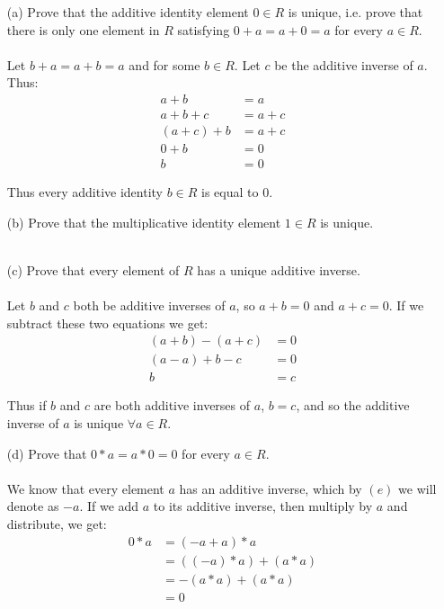 \documentclass[11pt,fleqn]{article}
\begin{document}
\begin{itemize}
\item[(a)] Prove that the additive identity element $0 \in R$ is unique, i.e. prove that there is only one element in $R$ satisfying $0 + a = a + 0 = a$ for every $a \in R$.\\
  \\
  Let $b + a = a + b = a$ and for some $b \in R$.  Let $c$ be the additive inverse of $a$.  Thus:
\begin{align}
  a + b &= a\nonumber\\
  a + b + c &= a + c\nonumber\\
  (a + c) + b &= a + c\nonumber\\
  0 + b &= 0\nonumber\\
  b &= 0\nonumber
\end{align}

Thus every additive identity $b \in R$ is equal to $0$.
  
\item[(b)] Prove that the multiplicative identity element $1 \in R$ is unique.\\
  \\
  
\item[(c)] Prove that every element of $R$ has a unique additive inverse.\\
  \\
  Let $b$ and $c$ both be additive inverses of $a$, so $a+b=0$ and $a+c=0$.  If we subtract these two equations we get:
  \begin{align}
    (a+b) - (a+c) &= 0\nonumber\\
    (a-a) + b - c &= 0\nonumber\\
    b &= c\nonumber
  \end{align}

  Thus if $b$ and $c$ are both additive inverses of $a$, $b = c$, and so the additive inverse of $a$ is unique $\forall a \in R$.

\item[(d)] Prove that $0 * a = a * 0 = 0$ for every $a \in R$.\\
  \\
  We know that every element $a$ has an additive inverse, which by $(e)$ we will denote as $-a$.  If we add $a$ to its additive inverse, then multiply by $a$ and distribute, we get:
\begin{align}
  0 * a &= (-a + a) * a\nonumber\\
  &= ((-a) * a) + (a * a)\nonumber\\
  &= -(a*a) + (a*a)\nonumber\\
  &= 0\nonumber
\end{align}
    

\end{itemize}
\end{document}
